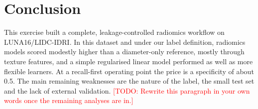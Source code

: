 \documentclass[journal]{IEEEtran}
\newcommand{\TODO}[1]{\textcolor{red}{[TODO: #1]}}
\begin{document}
\section{Conclusion}
This exercise built a complete, leakage-controlled radiomics workflow on LUNA16/LIDC-IDRI. In this dataset and under
our label definition, radiomics models scored modestly higher than a diameter-only reference, mostly through texture
features, and a simple regularised linear model performed as well as more flexible learners. At a recall-first operating point the price is a specificity of about 0.5. The main
remaining weaknesses are the nature of the label, the small test set and the lack of external validation.
\TODO{Rewrite this paragraph in your own words once the remaining analyses are in.}

\appendices
\end{document}
